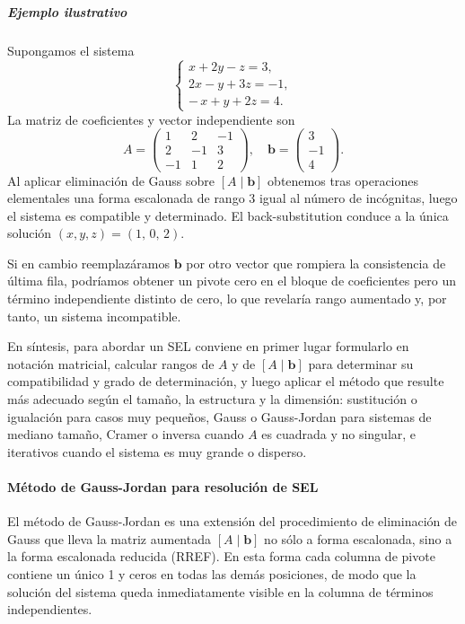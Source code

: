 \subparagraph{Ejemplo ilustrativo}

Supongamos el sistema
\[
\begin{cases}
x + 2y - z = 3,\\
2x - y + 3z = -1,\\
-\,x + y + 2z = 4.
\end{cases}
\]
La matriz de coeficientes y vector independiente son
\[
A = \begin{pmatrix}
1 & 2 & -1\\
2 & -1 & 3\\
-1 & 1 & 2
\end{pmatrix},\quad
\mathbf{b} = \begin{pmatrix}3\\-1\\4\end{pmatrix}.
\]
Al aplicar eliminación de Gauss sobre \([A\mid \mathbf{b}]\) obtenemos tras operaciones elementales una forma escalonada de rango 3 igual al número de incógnitas, luego el sistema es compatible y determinado. El back-substitution conduce a la única solución \((x,y,z) = (1,\,0,\,2)\).

Si en cambio reemplazáramos \(\mathbf{b}\) por otro vector que rompiera la consistencia de última fila, podríamos obtener un pivote cero en el bloque de coeficientes pero un término independiente distinto de cero, lo que revelaría rango aumentado y, por tanto, un sistema incompatible.

En síntesis, para abordar un SEL conviene en primer lugar formularlo en notación matricial, calcular rangos de \(A\) y de \([A\mid\mathbf{b}]\) para determinar su compatibilidad y grado de determinación, y luego aplicar el método que resulte más adecuado según el tamaño, la estructura y la dimensión: sustitución o igualación para casos muy pequeños, Gauss o Gauss-Jordan para sistemas de mediano tamaño, Cramer o inversa cuando \(A\) es cuadrada y no singular, e iterativos cuando el sistema es muy grande o disperso.

\vspace{5pt}

\paragraph{Método de Gauss-Jordan para resolución de SEL}

El método de Gauss-Jordan es una extensión del procedimiento de eliminación de Gauss que lleva la matriz aumentada \([A\mid \mathbf b]\) no sólo a forma escalonada, sino a la forma escalonada reducida (RREF). En esta forma cada columna de pivote contiene un único 1 y ceros en todas las demás posiciones, de modo que la solución del sistema queda inmediatamente visible en la columna de términos independientes.

